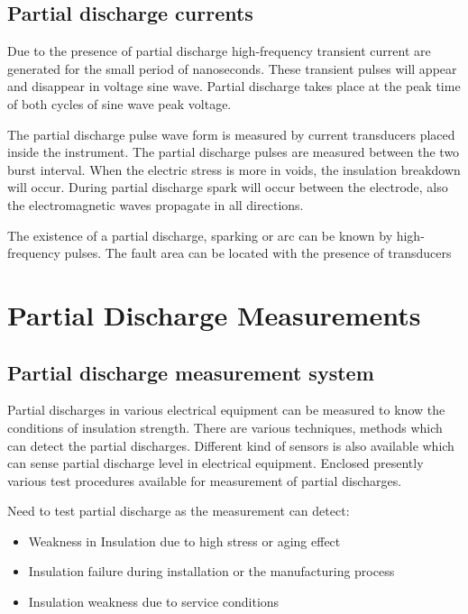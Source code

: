 \clearpage
\subsection{Partial discharge currents}
Due to the presence of partial discharge high-frequency transient current are generated for the small period of nanoseconds. These transient pulses will appear and disappear in voltage sine wave. Partial discharge takes place at the peak time of both cycles of sine wave peak voltage\setlength{\parskip}{1em}.

The partial discharge pulse wave form is measured by current transducers placed inside the instrument. The partial discharge pulses are measured between the two burst interval. When the electric stress is more in voids, the insulation breakdown will occur. During partial discharge spark will occur between the electrode, also the electromagnetic waves propagate in all directions.

The existence of a partial discharge, sparking or arc can be known by high-frequency pulses. The fault area can be located with the presence of transducers \setlength{\parskip}{0em} \cite{moore1997application2}

\clearpage
\section{Partial Discharge Measurements}
\subsection{Partial discharge measurement system}
Partial discharges in various electrical equipment can be measured to know the conditions of insulation strength. There are various techniques, methods which can detect the partial discharges. Different kind of sensors is also available which can sense partial discharge level in electrical equipment. Enclosed presently various test procedures available for measurement of partial discharges\setlength{\parskip}{1em}.

Need to test partial discharge as the measurement can detect:
\begin{itemize}
\item Weakness   in Insulation due to high stress or aging effect
\item Insulation failure during installation or the manufacturing process
\item Insulation weakness due to service conditions
\end{itemize}

